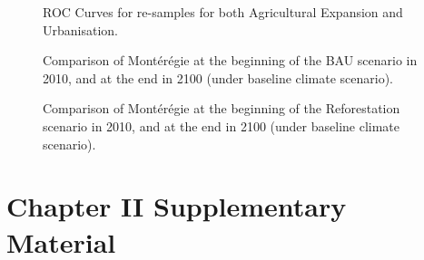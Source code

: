 
\begin{figure}[h!]
 \caption{ROC Curves for re-samples for both Agricultural Expansion and Urbanisation.}
 \label{fig:roc_rs}
\end{figure}


\begin{figure}[h!]
 \caption{Comparison of Montérégie at the beginning of the BAU scenario in 2010, and at the end in 2100 (under baseline climate scenario).}
 \label{fig:BAU_compare}
\end{figure}

\begin{figure}[h!]
 \caption{Comparison of Montérégie at the beginning of the Reforestation scenario in 2010, and at the end in 2100 (under baseline climate scenario).}
 \label{fig:Ref_compare}
\end{figure}

\newpage


\chapter*{\textbf{Chapter II Supplementary Material \\ \hspace{1em}}}

